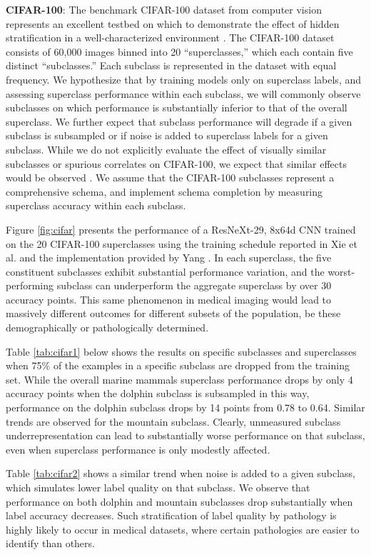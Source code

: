 \documentclass{article}
\begin{document}
\textbf{CIFAR-100}: The benchmark CIFAR-100 dataset from computer vision represents an excellent testbed on which to demonstrate the effect of hidden stratification in a well-characterized environment \citep{Krizhevsky2009-tq}.  
The CIFAR-100 dataset consists of 60,000 images binned into 20 ``superclasses,'' which each contain five distinct ``subclasses.'' 
 Each subclass is represented in the dataset with equal frequency.  
 We hypothesize that by training models only on superclass labels, and assessing superclass performance within each subclass, we will commonly observe subclasses on which performance is substantially inferior to that of the overall superclass.  
  We further expect that subclass performance will degrade if a given subclass is subsampled or if noise is added to superclass labels for a given subclass.  
 While we do not explicitly evaluate the effect of visually similar subclasses or spurious correlates on CIFAR-100, we expect that similar effects would be observed \citep{Selbst2017-gz}.  
 We assume that the CIFAR-100 subclasses represent a comprehensive schema, and implement schema completion by measuring superclass accuracy within each subclass.
 
 Figure \ref{fig:cifar} presents the performance of a ResNeXt-29, 8x64d CNN trained on the 20 CIFAR-100 superclasses using the training schedule reported in Xie et al. \citep{Xie2016-ip} and the implementation provided by Yang \citep{Yang_undated-bt}.  
In each superclass, the five constituent subclasses exhibit substantial performance variation, and the worst-performing subclass can underperform the aggregate superclass by over 30 accuracy points.  
This same phenomenon in medical imaging would lead to massively different outcomes for different subsets of the population, be these demographically or pathologically determined. 

 Table \ref{tab:cifar1} below shows the results on specific subclasses and superclasses when 75\% of the examples in a specific subclass are dropped from the training set.  
 While the overall marine mammals superclass performance drops by only 4 accuracy points when the dolphin subclass is subsampled in this way, performance on the dolphin subclass drops by 14 points from 0.78 to 0.64.  
 Similar trends are observed for the mountain subclass.  
 Clearly, unmeasured subclass underrepresentation can lead to substantially worse performance on that subclass, even when superclass performance is only modestly affected.
 
Table \ref{tab:cifar2} shows a similar trend when noise is added to a given subclass, which simulates lower label quality on that subclass.  We observe that performance on both dolphin and mountain subclasses drop substantially when label accuracy decreases.  
Such stratification of label quality by pathology is highly likely to occur in medical datasets, where certain pathologies are easier to identify than others.
\end{document}
